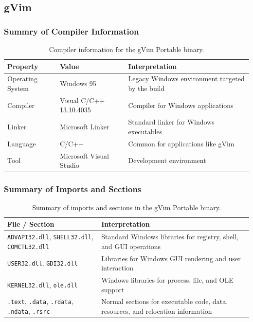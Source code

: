 \documentclass{article}
\begin{document}
\subsection{gVim}
\subsubsection{Summry of Compiler Information}
\begin{table}[H]
  \centering
  \begin{tabular}{|p{3cm}|p{3cm}|p{6cm}|}
    \hline
    \textbf{Property} & \textbf{Value} & \textbf{Interpretation} \\
    \hline
    Operating System & Windows 95 & Legacy Windows environment targeted by the build \\
    \hline
    Compiler & Visual C/C++ 13.10.4035 & Compiler for Windows applications \\
    \hline
    Linker & Microsoft Linker & Standard linker for Windows executables \\
    \hline
    Language & C/C++ & Common for applications like gVim \\
    \hline
    Tool & Microsoft Visual Studio & Development environment \\
    \hline
  \end{tabular}
  \caption{Compiler information for the gVim Portable binary.}
  \label{tab:gvim-compiler}
\end{table}

\subsubsection{Summary of Imports and Sections}
\begin{table}[H]
  \centering
  \begin{tabular}{|p{4cm}|p{8cm}|}
    \hline
    \textbf{File / Section} & \textbf{Interpretation} \\
    \hline
    \texttt{ADVAPI32.dll}, \texttt{SHELL32.dll}, \texttt{COMCTL32.dll} & Standard Windows libraries for registry, shell, and GUI operations \\
    \hline
    \texttt{USER32.dll}, \texttt{GDI32.dll} & Libraries for Windows GUI rendering and user interaction \\
    \hline
    \texttt{KERNEL32.dll}, \texttt{ole.dll} & Windows libraries for process, file, and OLE support \\
    \hline
    \texttt{.text}, \texttt{.data}, \texttt{.rdata}, \texttt{.ndata}, \texttt{.rsrc} & Normal sections for executable code, data, resources, and relocation information \\
    \hline
  \end{tabular}
  \caption{Summary of imports and sections in the gVim Portable binary.}
  \label{tab:gvim-imports}
\end{table}
\end{document}

